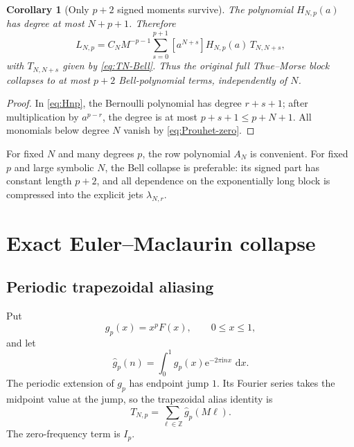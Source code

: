 \documentclass[11pt,oneside]{article}
\numberwithin{equation}{section}
\newtheorem{corollary}[theorem]{Corollary}
\theoremstyle{definition}
\theoremstyle{remark}
\newcommand{\Z}{\mathbb Z}
\newcommand{\dd}{\,\mathrm d}
\newcommand{\e}{\mathrm e}
\newcommand{\ii}{\mathrm i}
\begin{document}
\begin{corollary}[Only \(p+2\) signed moments survive]
\label{cor:pplus2}
The polynomial \(H_{N,p}(a)\) has degree at most \(N+p+1\).  Therefore
\begin{equation}
 \boxed{\displaystyle
 L_{N,p}=C_NM^{-p-1}
 \sum_{s=0}^{p+1}[a^{N+s}]H_{N,p}(a)\,T_{N,N+s},}
 \label{eq:Bell-collapse}
\end{equation}
with \(T_{N,N+s}\) given by \eqref{eq:TN-Bell}.  Thus the original full
Thue--Morse block collapses to at most \(p+2\) Bell-polynomial terms, independently of
\(N\).
\end{corollary}

\begin{proof}
In \eqref{eq:Hnp}, the Bernoulli polynomial has degree \(r+s+1\); after multiplication
by \(a^{p-r}\), the degree is at most \(p+s+1\le p+N+1\).  All monomials below degree
\(N\) vanish by \eqref{eq:Prouhet-zero}.
\end{proof}

\begin{resultbox}
For fixed \(N\) and many degrees \(p\), the row polynomial \(A_N\) is convenient.  For
fixed \(p\) and large symbolic \(N\), the Bell collapse is preferable: its signed part
has constant length \(p+2\), and all dependence on the exponentially long block is
compressed into the explicit jets \(\lambda_{N,r}\).
\end{resultbox}

\section{Exact Euler--Maclaurin collapse}
\label{sec:em}

\subsection{Periodic trapezoidal aliasing}

Put
\begin{equation}
 g_p(x)=x^pF(x),\qquad 0\le x\le1,
 \label{eq:gp}
\end{equation}
and let
\begin{equation}
 \widehat g_p(n)=\int_0^1g_p(x)\e^{-2\pi\ii nx}\,\dd x.
 \label{eq:gphat}
\end{equation}
The periodic extension of \(g_p\) has endpoint jump \(1\).  Its Fourier series takes
the midpoint value at the jump, so the trapezoidal alias identity is
\begin{equation}
 T_{N,p}=\sum_{\ell\in\Z}\widehat g_p(M\ell).
 \label{eq:trap-alias}
\end{equation}
The zero-frequency term is \(I_p\).
\end{document}
